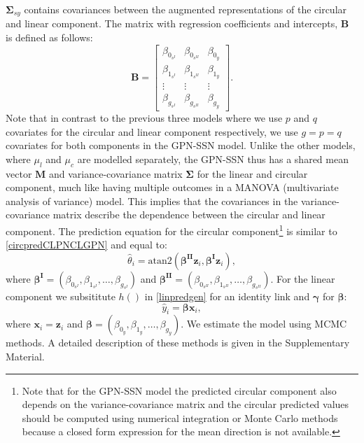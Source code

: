 \documentclass[man,mask]{apa6}
\let\rmarkdownfootnote\footnote%
\def\footnote{\protect\rmarkdownfootnote}
\begin{document}
\(\boldsymbol{\Sigma}_{sy}\) contains covariances between the augmented
representations of the circular and linear component. The matrix with
regression coefficients and intercepts, \(\boldsymbol{B}\) is defined as follows:
\begin{equation}\label{regmatGPNSSN}
\boldsymbol{B} = \begin{bmatrix}
\beta_{0_{s^{I}}} & \beta_{0_{s^{II}}} & \beta_{0_{y}}\\
\beta_{1_{s^{I}}} & \beta_{1_{s^{II}}} & \beta_{1_{y}}\\
\vdots & \vdots & \vdots \\
\beta_{g_{s^{I}}} & \beta_{g_{s^{II}}} & \beta_{g_{y}} \end{bmatrix}.
\end{equation}
\noindent Note that in contrast to the previous three models where we use \(p\)
and \(q\) covariates for the circular and linear component respectively, we use \(g = p = q\) covariates for both components in the GPN-SSN model. Unlike the other
models, where \(\mu_l\) and \(\mu_c\) are modelled separately, the GPN-SSN thus has
a shared mean vector \(\boldsymbol{M}\) and variance-covariance matrix
\(\boldsymbol{\Sigma}\) for the linear and circular component, much like having
multiple outcomes in a MANOVA (multivariate analysis of variance) model. This
implies that the covariances in the variance-covariance matrix describe the
dependence between the circular and linear component.\newline
\indent The prediction equation for the circular component\footnote{Note that for the  GPN-SSN model the predicted circular component also depends on the variance-covariance matrix and the circular predicted values should be computed using numerical integration or Monte Carlo methods because a closed form expression for the mean direction is not available.} is similar to \eqref{circpredCLPNCLGPN} and equal to:
\begin{equation}\label{circpredGPNSSN}
\hat{\theta}_i = \text{atan2}(\boldsymbol{\beta^{II}}\boldsymbol{z}_i, \boldsymbol{\beta^{I}}\boldsymbol{z}_i),
\end{equation}
\noindent where \(\boldsymbol{\beta^I} = (\beta_{0_{s^{I}}}, \beta_{1_{s^{I}}}, \dots, \beta_{g_{s^{I}}})\) and \(\boldsymbol{\beta^{II}} = (\beta_{0_{s^{II}}}, \beta_{1_{s^{II}}}, \dots, \beta_{g_{s^{II}}})\).
For the linear component we subsititute \(h()\) in \eqref{linpredgen} for an identity link and \(\boldsymbol{\gamma}\) for \(\boldsymbol{\beta}\):
\begin{equation}\label{linpredGPNSSN}
\hat{y}_i = \boldsymbol{\beta}\boldsymbol{x}_i,
\end{equation}
\noindent where \(\boldsymbol{x}_i = \boldsymbol{z}_i\) and \(\boldsymbol{\beta} = (\beta_{0_{y}}, \beta_{1_{y}}, \dots, \beta_{g_{y}})\).\newline
\indent We estimate the model using MCMC methods. A detailed description of these
methods is given in the Supplementary Material.
\end{document}
